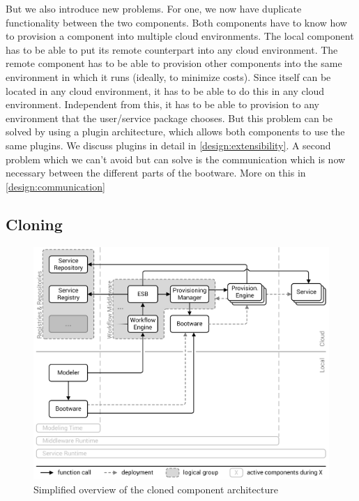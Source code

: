 But we also introduce new problems.
For one, we now have duplicate functionality between the two components.
Both components have to know how to provision a component into multiple cloud environments.
The local component has to be able to put its remote counterpart into any cloud environment.
The remote component has to be able to provision other components into the same environment in which it runs (ideally, to minimize costs).
Since itself can be located in any cloud environment, it has to be able to do this in any cloud environment.
Independent from this, it has to be able to provision to any environment that the user/service package chooses.
But this problem can be solved by using a plugin architecture, which allows both components to use the same plugins.
We discuss plugins in detail in \autoref{design:extensibility}.
A second problem which we can't avoid but can solve is the communication which is now necessary between the different parts of the bootware.
More on this in \autoref{design:communication}

\subsection{Cloning}

\begin{figure}[!htbp]
	\centering
	\includegraphics[resolution=600]{design/assets/clone}
	\caption{Simplified overview of the cloned component architecture}
	\label{image:clone}
\end{figure}

